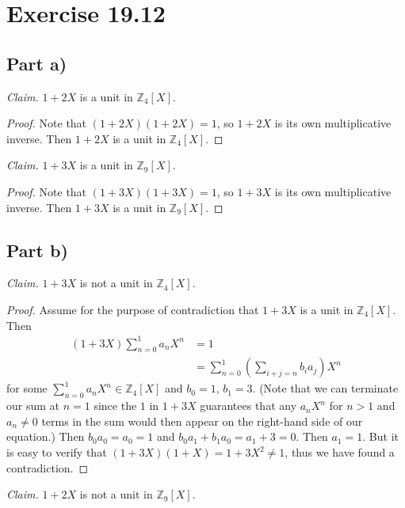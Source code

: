 \documentclass{abrice}
\newcommand{\Z}{\mathbb{Z}}
\begin{document}
\section{Exercise 19.12}

\subsection{Part a)}

\emph{Claim.} $1 + 2X$ is a unit in $\Z_4[X]$.

\begin{proof}
  Note that $(1 + 2X)(1 + 2X) = 1$, so $1 + 2X$ is its own multiplicative
  inverse. Then $1 + 2X$ is a unit in $\Z_4[X]$.
\end{proof}

\noindent
\emph{Claim.} $1 + 3X$ is a unit in $\Z_9[X]$.

\begin{proof}
  Note that $(1 + 3X)(1 + 3X) = 1$, so $1 + 3X$ is its own multiplicative
  inverse. Then $1 + 3X$ is a unit in $\Z_9[X]$.
\end{proof}

\subsection{Part b)}

\emph{Claim.} $1 + 3X$ is not a unit in $\Z_4[X]$.

\begin{proof}
  Assume for the purpose of contradiction that $1 + 3X$ is a unit in $\Z_4[X]$.
  Then
  \begin{align*}
    (1 + 3X) \sum_{n=0}^{1} a_n X^n
    &= 1 \\
    &= \sum_{n=0}^{1} \left( \sum_{i+j=n} b_i a_j \right) X^n
  \end{align*}
  for some $\sum_{n=0}^{1} a_n X^n \in \Z_4[X]$ and $b_0 = 1$, $b_1 = 3$. (Note
  that we can terminate our sum at $n = 1$ since the $1$ in $1 + 3X$ guarantees
  that any $a_n X^n$ for $n > 1$ and $a_n \neq 0$ terms in the sum would then
  appear on the right-hand side of our equation.) Then $b_0 a_0 = a_0 = 1$ and
  $b_0 a_1 + b_1 a_0 = a_1 + 3 = 0$. Then $a_1 = 1$. But it is easy to verify
  that $(1 + 3X)(1 + X) = 1 + 3X^2 \neq 1$, thus we have found a contradiction.
\end{proof}

\noindent
\emph{Claim.} $1 + 2X$ is not a unit in $\Z_9[X]$.
\end{document}
